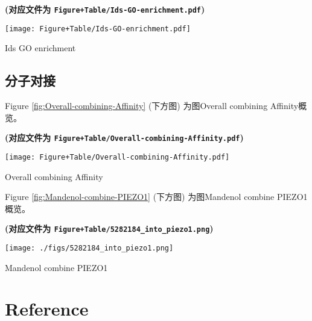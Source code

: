 \documentclass[
]{article}
\begin{document}
\textbf{(对应文件为 \texttt{Figure+Table/Ids-GO-enrichment.pdf})}

\def\@captype{figure}
\begin{center}
\texttt{[image: Figure+Table/Ids-GO-enrichment.pdf]}
\caption{Ids GO enrichment}\label{fig:Ids-GO-enrichment}
\end{center}

\hypertarget{ux5206ux5b50ux5bf9ux63a5}{%
\subsection{分子对接}\label{ux5206ux5b50ux5bf9ux63a5}}

Figure \ref{fig:Overall-combining-Affinity} (下方图) 为图Overall combining Affinity概览。

\textbf{(对应文件为 \texttt{Figure+Table/Overall-combining-Affinity.pdf})}

\def\@captype{figure}
\begin{center}
\texttt{[image: Figure+Table/Overall-combining-Affinity.pdf]}
\caption{Overall combining Affinity}\label{fig:Overall-combining-Affinity}
\end{center}

Figure \ref{fig:Mandenol-combine-PIEZO1} (下方图) 为图Mandenol combine PIEZO1概览。

\textbf{(对应文件为 \texttt{Figure+Table/5282184\_into\_piezo1.png})}

\def\@captype{figure}
\begin{center}
\texttt{[image: ./figs/5282184\_into\_piezo1.png]}
\caption{Mandenol combine PIEZO1}\label{fig:Mandenol-combine-PIEZO1}
\end{center}

\hypertarget{bibliography}{%
\section*{Reference}\label{bibliography}}
\end{document}
